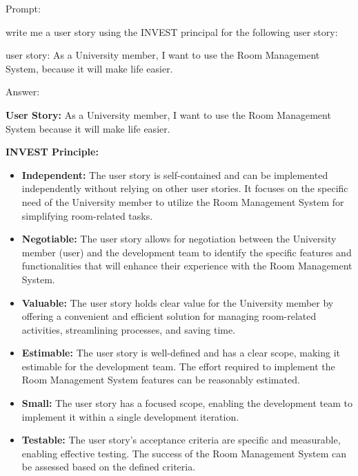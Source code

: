 \documentclass[article,onecolumn]{IEEEtran}
\begin{document}
Prompt:
\begin{framed}
	\small
	write me a user story using the INVEST principal for the following user story:
	
	user story: 
	As a University member, I want to use the Room Management System, because it will make life easier.
\end{framed}

Answer:
\begin{framed}
	\small
	\textbf{User Story:} As a University member, I want to use the Room Management System because it will make life easier.
	
	\textbf{INVEST Principle:}
	
	\begin{itemize}
		\item \textbf{Independent:} The user story is self-contained and can be implemented independently without relying on other user stories. It focuses on the specific need of the University member to utilize the Room Management System for simplifying room-related tasks.
		
		\item \textbf{Negotiable:} The user story allows for negotiation between the University member (user) and the development team to identify the specific features and functionalities that will enhance their experience with the Room Management System.
		
		\item \textbf{Valuable:} The user story holds clear value for the University member by offering a convenient and efficient solution for managing room-related activities, streamlining processes, and saving time.
		
		\item \textbf{Estimable:} The user story is well-defined and has a clear scope, making it estimable for the development team. The effort required to implement the Room Management System features can be reasonably estimated.
		
		\item \textbf{Small:} The user story has a focused scope, enabling the development team to implement it within a single development iteration.
		
		\item \textbf{Testable:} The user story's acceptance criteria are specific and measurable, enabling effective testing. The success of the Room Management System can be assessed based on the defined criteria.
	\end{itemize}
	

\end{framed}
\end{document}
